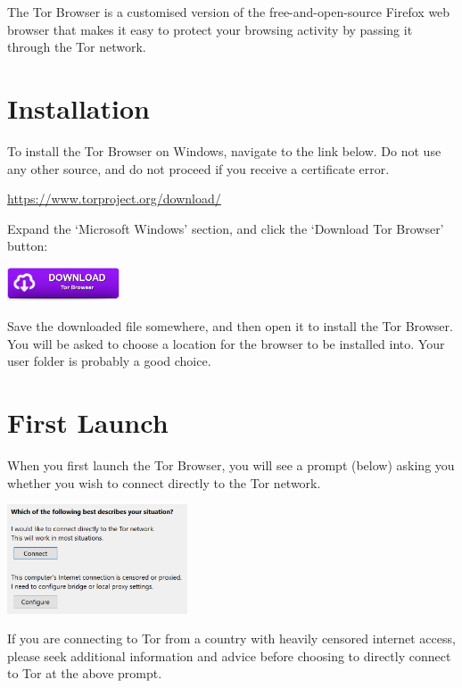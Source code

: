 \documentclass[10.5pt,a4paper]{article} %
\begin{document}
\begin{multicols*}{2} %

The Tor Browser is a customised version of the free-and-open-source Firefox web browser that makes it easy to protect your browsing activity by passing it through the Tor network.


\section*{Installation}
To install the Tor Browser on Windows, navigate to the link below. Do not use any other source, and do not proceed if you receive a certificate error.

\begin{center}
	\url{https://www.torproject.org/download/} %
\end{center}

Expand the `Microsoft Windows' section, and click the `Download Tor Browser' button:
\begin{center}
	\includegraphics[width=0.25\textwidth]{downloadbutton.png} %
\end{center}

Save the downloaded file somewhere, and then open it to install the Tor Browser. You will be asked to choose a location for the browser to be installed into. Your user folder is probably a good choice.


\section*{First Launch}
When you first launch the Tor Browser, you will see a prompt (below) asking you whether you wish to connect directly to the Tor network.

\begin{center}
	\includegraphics[width=0.40\textwidth]{first-run.png}
\end{center}

If you are connecting to Tor from a country with heavily censored internet access, please seek additional information and advice before choosing to directly connect to Tor at the above prompt.


\end{multicols*}
\end{document}

